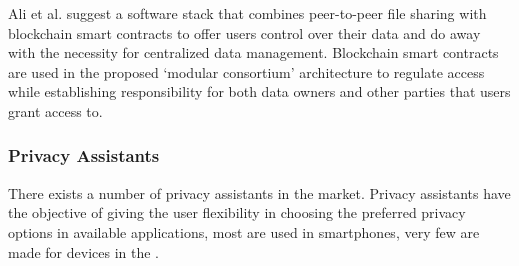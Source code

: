 Ali et al. \cite{AliIoT} suggest a software stack that combines peer-to-peer
file sharing with blockchain smart contracts to offer \hyperlink{\acronym}{\acronym} users control
over their data and do away with the necessity for centralized \hyperlink{\acronym}{\acronym} data
management. Blockchain smart contracts are used in the proposed `modular
consortium' architecture to regulate access while establishing responsibility
for both data owners and other parties that users grant access to.

\subsubsection{Privacy Assistants}

There exists a number of privacy assistants in the market. Privacy assistants
have the objective of giving the user flexibility in choosing the preferred
privacy options in available applications, most are used in smartphones,
very few are made for devices in the \hyperlink{\acronym}{\acronym}.

